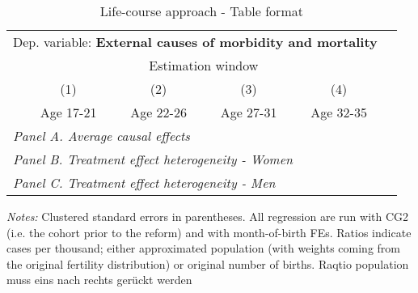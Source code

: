  \begin{table}[H] \centering \begin{threeparttable} \caption{Life-course approach - Table format} {\def\sym#1{\ifmmode^{#1}\else\(^{#1}\)\fi} \begin{tabular}{l*{5}{c}} \toprule \multicolumn{5}{l}{Dep. variable: \textbf{External causes of morbidity and mortality}} \\ & \multicolumn{4}{c}{Estimation window} \\ \cmidrule(lr){2-5}
            &\multicolumn{1}{c}{(1)}&\multicolumn{1}{c}{(2)}&\multicolumn{1}{c}{(3)}&\multicolumn{1}{c}{(4)}\\
            &\multicolumn{1}{c}{Age 17-21}&\multicolumn{1}{c}{Age 22-26}&\multicolumn{1}{c}{Age 27-31}&\multicolumn{1}{c}{Age 32-35}\\
\midrule
 \multicolumn{5}{l}{\emph{Panel A. Average causal effects}} \\      \midrule\multicolumn{5}{l}{\emph{Panel B. Treatment effect heterogeneity - Women}} \\      \midrule\multicolumn{5}{l}{\emph{Panel C. Treatment effect heterogeneity - Men}} \\      
\bottomrule \end{tabular} } \begin{tablenotes} \item \scriptsize \emph{Notes:} Clustered standard errors in parentheses. All regression are run with CG2 (i.e. the cohort prior to the reform) and with month-of-birth FEs. Ratios indicate cases per thousand; either approximated population (with weights coming from the original fertility distribution) or original number of births. Raqtio population muss eins nach rechts gerückt werden \end{tablenotes} \end{threeparttable} \end{table} 
